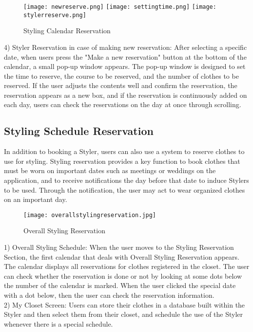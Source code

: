 \documentclass[conference]{IEEEtran}
\begin{document}
\begin{figure}[htbp]
\centerline{
\texttt{[image: newreserve.png]}
\texttt{[image: settingtime.png]}
\texttt{[image: stylerreserve.png]}
}
\caption{Styling Calendar Reservation}
\label{fig}
\end{figure}
4) Styler Reservation in case of making new reservation: After selecting a specific date, when users press the "Make a new reservation" button at the bottom of the calendar, a small pop-up window appears. The pop-up window is designed to set the time to reserve, the course to be reserved, and the number of clothes to be reserved. If the user adjusts the contents well and confirm the reservation, the reservation appears as a new box, and if the reservation is continuously added on each day, users can check the reservations on the day at once through scrolling.\\

\subsection{Styling Schedule Reservation}
In addition to booking a Styler, users can also use a system to reserve clothes to use for styling. Styling reservation provides a key function to book clothes that must be worn on important dates such as meetings or weddings on the application, and to receive notifications the day before that date to induce Stylers to be used. Through the notification, the user may act to wear organized clothes on an important day.\\

\begin{figure}[htbp]
\centerline{\texttt{[image: overallstylingreservation.jpg]}}
\label{fig}
\caption{Overall Styling Reservation}
\end{figure}
1) Overall Styling Schedule: When the user moves to the Styling Reservation Section, the first calendar that deals with Overall Styling Reservation appears. The calendar displays all reservations for clothes registered in the closet. The user can check whether the reservation is done or not by looking at some dots below the number of the calendar is marked. When the user clicked the special date with a dot below, then the user can check the reservation information.\\


2) My Closet Screen: Users can store their clothes in a database built within the Styler and then select them from their closet, and schedule the use of the Styler whenever there is a special schedule.\\
\end{document}

